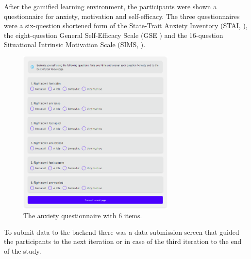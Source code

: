 After the gamified learning environment, the participants were shown a questionnaire for anxiety, motivation and self-efficacy.
The three questionnaires were a six-question shortened form of the State-Trait Anxiety Inventory (STAI, \textcite{marteauDevelopmentSixitemShortform1992}), the eight-question General Self-Efficacy Scale (GSE \textcite{guayAssessmentSituationalIntrinsic2000}) and the 16-question Situational Intrinsic Motivation Scale (SIMS, \textcite{chenValidationNewGeneral2001}).
\begin{figure}[H]
  \centering
  \includegraphics[width=0.7\textwidth]{img/Stai.png}
  \caption{The anxiety questionnaire with 6 items.}
  \label{fig:figureAnxiety}
\end{figure}
To submit data to the backend there was a data submission screen that guided the participants to the next iteration or in case of the third iteration to the end of the study.

